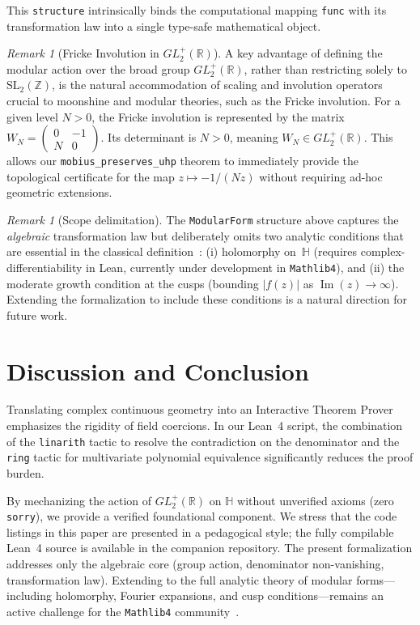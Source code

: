 \documentclass[11pt, a4paper]{article}
\theoremstyle{remark}
\newtheorem{remark}[theorem]{Remark}
\begin{document}
This \texttt{structure} intrinsically binds the computational mapping \texttt{func} with its transformation law into a single type-safe mathematical object.

\begin{remark}[Fricke Involution in $GL_2^+(\mathbb{R})$]
A key advantage of defining the modular action over the broad group $GL_2^+(\mathbb{R})$, rather than restricting solely to $\mathrm{SL}_2(\mathbb{Z})$, is the natural accommodation of scaling and involution operators crucial to moonshine and modular theories, such as the Fricke involution. For a given level $N > 0$, the Fricke involution is represented by the matrix $W_N = \begin{pmatrix} 0 & -1 \\ N & 0 \end{pmatrix}$. Its determinant is $N > 0$, meaning $W_N \in GL_2^+(\mathbb{R})$. This allows our \texttt{mobius\_preserves\_uhp} theorem to immediately provide the topological certificate for the map $z \mapsto -1/(Nz)$ without requiring ad-hoc geometric extensions.
\end{remark}

\begin{remark}[Scope delimitation]
The \texttt{ModularForm} structure above captures the \emph{algebraic} transformation law but deliberately omits two analytic conditions that are essential in the classical definition~\cite{DiamondShurman2005}: (i) holomorphy on~$\mathbb{H}$ (requires complex-differentiability in Lean, currently under development in \texttt{Mathlib4}), and (ii) the moderate growth condition at the cusps (bounding $|f(z)|$ as $\operatorname{Im}(z) \to \infty$). Extending the formalization to include these conditions is a natural direction for future work.
\end{remark}

\section{Discussion and Conclusion}

Translating complex continuous geometry into an Interactive Theorem Prover emphasizes the rigidity of field coercions. In our Lean~4 script, the combination of the \texttt{linarith} tactic to resolve the contradiction on the denominator and the \texttt{ring} tactic for multivariate polynomial equivalence significantly reduces the proof burden.

By mechanizing the action of $GL_2^+(\mathbb{R})$ on $\mathbb{H}$ without unverified axioms (zero \texttt{sorry}), we provide a verified foundational component. We stress that the code listings in this paper are presented in a pedagogical style; the fully compilable Lean~4 source is available in the companion repository. The present formalization addresses only the algebraic core (group action, denominator non-vanishing, transformation law). Extending to the full analytic theory of modular forms---including holomorphy, Fourier expansions, and cusp conditions---remains an active challenge for the \texttt{Mathlib4} community~\cite{Mathlib2020, Buzzard2021}.
\end{document}
